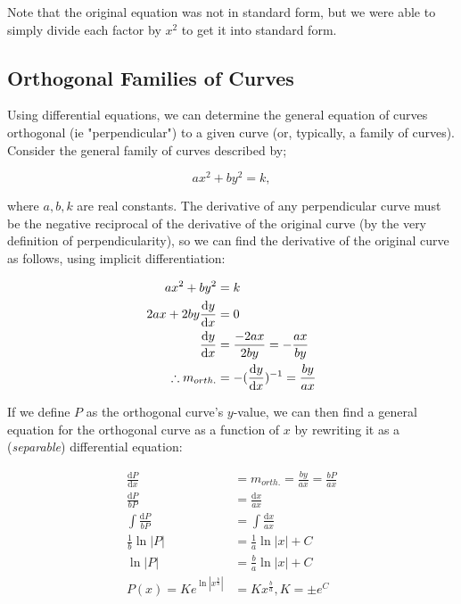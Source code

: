 \documentclass[12pt]{article}
\begin{document}
Note that the original equation was not in standard form, but we were able to simply divide each factor by $x^2$ to get it into standard form.

\subsection{Orthogonal Families of Curves}

Using differential equations, we can determine the general equation of curves orthogonal (ie "perpendicular") to a given curve (or, typically, a family of curves). Consider the general family of curves described by;

$$ax^2+by^2=k,$$

where $a,b,k$ are real constants. The derivative of any perpendicular curve must be the negative reciprocal of the derivative of the original curve (by the very definition of perpendicularity), so we can find the derivative of the original curve as follows, using implicit differentiation:

\begin{equation}
    \begin{split}
        ax^2+by^2 &= k\\
        2ax + 2by\frac{\text{d}y}{\text{d}x} &= 0\\
        \frac{\text{d}y}{\text{d}x} &= \frac{-2ax}{2by} = -\frac{ax}{by}\\
        \therefore m_{orth.} &= -(\frac{\text{d}y}{\text{d}x})^{-1} = \frac{by}{ax}\\
    \end{split}
\end{equation}

If we define $P$ as the orthogonal curve's $y$-value, we can then find a general equation for the orthogonal curve as a function of $x$ by rewriting it as a (\textit{separable}) differential equation:

\begin{equation}
    \begin{split}
        \frac{\text{d}P}{\text{d}x} &= m_{orth.} = \frac{by}{ax} = \frac{bP}{ax}\\
        \frac{\text{d}P}{bP} &= \frac{\text{d}x}{ax}\\
        \int \frac{\text{d}P}{bP} &= \int \frac{\text{d}x}{ax}\\
        \frac{1}{b}\ln |P| &= \frac{1}{a}\ln |x| + C\\
        \ln |P| &= \frac{b}{a}\ln|x|+C\\
        P(x) = Ke^{\ln |x^{\frac{b}{a}}|} &= Kx^{\frac{b}{a}}, K = \pm e^{C}\\
    \end{split}
\end{equation}
\end{document}
